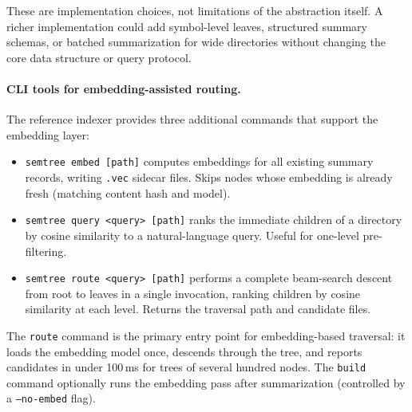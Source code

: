 These are implementation choices, not limitations of the \srt{} abstraction itself.
A richer implementation could add symbol-level leaves, structured summary schemas, or batched summarization for wide directories without changing the core data structure or query protocol.


\paragraph{CLI tools for embedding-assisted routing.}
The reference indexer provides three additional commands that support the embedding layer:
\begin{itemize}[nosep]
    \item \texttt{semtree embed [path]} computes embeddings for all existing summary records, writing \texttt{.vec} sidecar files. Skips nodes whose embedding is already fresh (matching content hash and model).
    \item \texttt{semtree query <query> [path]} ranks the immediate children of a directory by cosine similarity to a natural-language query. Useful for one-level pre-filtering.
    \item \texttt{semtree route <query> [path]} performs a complete beam-search descent from root to leaves in a single invocation, ranking children by cosine similarity at each level. Returns the traversal path and candidate files.
\end{itemize}
The \texttt{route} command is the primary entry point for embedding-based traversal: it loads the embedding model once, descends through the tree, and reports candidates in under 100\,ms for trees of several hundred nodes.
The \texttt{build} command optionally runs the embedding pass after summarization (controlled by a \texttt{--no-embed} flag).
